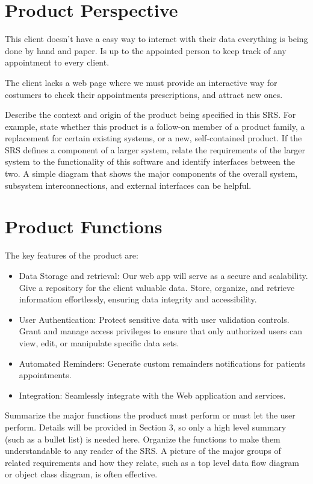 \documentclass{scrreprt}
\begin{document}
	\section{Product Perspective}
	This client doesn't have a easy way to interact with their data everything is being done by hand and paper. Is up to the appointed person to keep track of any appointment to every client.
	
	The client lacks a web page where we must provide an interactive  way for costumers to check their appointments prescriptions, and attract new ones.
	
	 
	Describe the context and origin of the product being specified in this SRS.  
	For example, state whether this product is a follow-on member of a product 
	family, a replacement for certain existing systems, or a new, self-contained 
	product. If the SRS defines a component of a larger system, relate the 
	requirements of the larger system to the functionality of this software and 
	identify interfaces between the two. A simple diagram that shows the major 
	components of the overall system, subsystem interconnections, and external 
	interfaces can be helpful.
	
	\section{Product Functions}
	
	The key features of the product are:
	\begin{itemize}
		\item	Data Storage and retrieval: Our web app will serve as a secure and scalability. Give a repository for the client valuable data. Store, organize, and retrieve information effortlessly, ensuring data integrity and accessibility.
		\item	User Authentication: Protect sensitive data with user validation controls. Grant and manage access privileges to ensure that only authorized users can view, edit, or manipulate specific data sets.
		\item Automated Reminders: Generate custom remainders notifications for patients appointments.
		\item Integration: Seamlessly integrate with the Web application and services.
	\end{itemize}
	
	
	
	Summarize the major functions the product must perform or must let the user 
	perform. Details will be provided in Section 3, so only a high level summary 
	(such as a bullet list) is needed here. Organize the functions to make them 
	understandable to any reader of the SRS. A picture of the major groups of 
	related requirements and how they relate, such as a top level data flow diagram 
	or object class diagram, is often effective.
	
\end{document}

